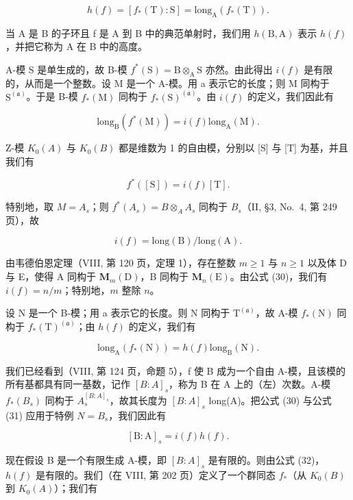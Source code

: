 \[
h (f) = [ f _ {*} (\mathrm{T}): \mathrm{S} ] = \mathrm{long} _ {\mathrm{A}} (f _ {*} (\mathrm{T})).\tag{27}
\]

当 A 是 B 的子环且 f 是 A 到 B 中的典范单射时，我们用 \(h(\mathrm{B}, \mathrm{A})\) 表示 \(h(f)\)，并把它称为 A 在 B 中的高度。

A-模 S 是单生成的，故 B-模 \(f^{*}(\mathrm{S}) = \mathrm{B} \otimes_{\mathrm{A}} \mathrm{S}\) 亦然。由此得出 \(i(f)\) 是有限的，从而是一个整数。设 M 是一个 A-模。用 a 表示它的长度；则 M 同构于 \(\mathrm{S}^{(\mathfrak{a})}\)。于是 B-模 \(f_{*}(\mathrm{M})\) 同构于 \(f_{*}(\mathrm{S})^{(\mathfrak{a})}\)。由 \(i(f)\) 的定义，我们因此有

\[
\mathrm{long} _ {\mathrm{B}} (f ^ {*} (\mathrm{M})) = i (f) \mathrm{long} _ {\mathrm{A}} (\mathrm{M}).\tag{28}
\]

Z-模 \(K_{0}(A)\) 与 \(K_{0}(B)\) 都是维数为 1 的自由模，分别以 {[}S{]} 与 {[}T{]} 为基，并且我们有

\[
f ^ {*} ([ \mathrm{S} ]) = i (f) [ \mathrm{T} ].\tag{29}
\]

特别地，取 \(M = A_{s}\)；则 \(f^{*}(A_{s}) = B \otimes_{A} A_{s}\) 同构于 \(B_{s}\)（II, §3, No.~4, 第 249 页），故

\[
i (f) = \mathrm{long(B)} / \mathrm{long(A)}.\tag{30}
\]

由韦德伯恩定理（VIII, 第 120 页，定理 1），存在整数 \(m \geqslant 1\) 与 \(n \geqslant 1\) 以及体 D 与 E，使得 A 同构于 \(\mathbf{M}_m(\mathrm{D})\)，B 同构于 \(\mathbf{M}_n(\mathrm{E})\)。由公式 (30)，我们有 \(i(f) = n / m\)；特别地，\(m\) 整除 \(n\)。

设 N 是一个 B-模；用 a 表示它的长度。则 N 同构于 \(\mathrm{T}^{(\mathfrak{a})}\)，故 A-模 \(f_{*}(\mathrm{N})\) 同构于 \(f_{*}(\mathrm{T})^{(\mathfrak{a})}\)；由 \(h(f)\) 的定义，我们有

\[
\mathrm{long} _ {\mathrm{A}} (f _ {*} (\mathrm{N})) = h (f) \mathrm{long} _ {\mathrm{B}} (\mathrm{N}).\tag{31}
\]

我们已经看到（VIII, 第 124 页，命题 5），f 使 B 成为一个自由 A-模，且该模的所有基都具有同一基数，记作 \([B:A]_{s}\)，称为 B 在 A 上的（左）次数。A-模 \(f_{*}(B_{s})\) 同构于 \(A_{s}^{[B:A]_{s}}\)，故其长度为 \([B:A]_{s}\) long(A)。把公式 (30) 与公式 (31) 应用于特例 \(N=B_{s}\)，我们因此有

\[
[ \mathrm{B}: \mathrm{A} ] _ {s} = i (f) h (f).\tag{32}
\]

现在假设 B 是一个有限生成 A-模，即 \([B:A]_{s}\) 是有限的。则由公式 (32)，\(h(f)\) 是有限的。我们（在 VIII, 第 202 页）定义了一个群同态 \(f_{*}\)（从 \(K_{0}(B)\) 到 \(K_{0}(A)\)）；我们有

